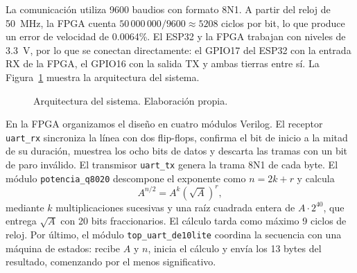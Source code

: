 \documentclass[11pt,letterpaper]{article}
\begin{document}
La comunicación utiliza 9600 baudios con formato 8N1. A partir del reloj de
50~MHz, la FPGA cuenta $50\,000\,000/9600 \approx 5208$ ciclos por bit, lo que
produce un error de velocidad de 0.0064\%. El ESP32 y la FPGA trabajan con
niveles de 3.3~V, por lo que se conectan directamente: el GPIO17 del ESP32
con la entrada RX de la FPGA, el GPIO16 con la salida TX y ambas tierras
entre sí. La Figura~\ref{fig:arquitectura} muestra la arquitectura del
sistema.

\begin{figure}[H]
\centering
{}
\caption{Arquitectura del sistema. Elaboración propia.}
\label{fig:arquitectura}
\end{figure}

En la FPGA organizamos el diseño en cuatro módulos Verilog. El receptor
\texttt{uart\_rx} sincroniza la línea con dos flip-flops, confirma el bit de
inicio a la mitad de su duración, muestrea los ocho bits de datos y descarta
las tramas con un bit de paro inválido. El transmisor \texttt{uart\_tx} genera
la trama 8N1 de cada byte. El módulo \texttt{potencia\_q8020} descompone el
exponente como $n = 2k + r$ y calcula
\begin{equation}
A^{n/2} = A^{k}\left(\sqrt{A}\right)^{r},
\end{equation}
mediante $k$ multiplicaciones sucesivas y una raíz cuadrada entera de
$A \cdot 2^{40}$, que entrega $\sqrt{A}$ con 20 bits fraccionarios. El
cálculo tarda como máximo 9 ciclos de reloj. Por último, el módulo
\texttt{top\_uart\_de10lite} coordina la secuencia con una máquina de
estados: recibe $A$ y $n$, inicia el cálculo y envía los 13 bytes del
resultado, comenzando por el menos significativo.
\end{document}
